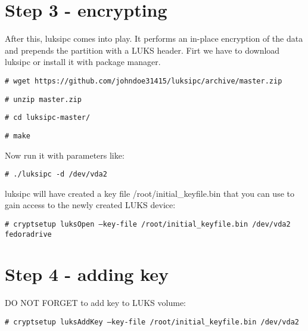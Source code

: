 \documentclass[../xdudla00-porting-Tang-to-Open-WRT.tex]{subfiles}
\begin{document}
\section{Step 3 - encrypting}
After this, luksipc comes into play. It performs an in-place encryption of the data and prepends the partition with a LUKS header. Firt we have to download luksipc or install it with package manager.

{\tt \# wget https://github.com/johndoe31415/luksipc/archive/master.zip}

{\tt \# unzip master.zip}

{\tt \# cd luksipc-master/}

{\tt \# make}

Now run it with parameters like:

{\tt \# ./luksipc -d /dev/vda2}

luksipc will have created a key file /root/initial\_keyfile.bin that you can use to gain access to the newly created LUKS device:

{\tt \# cryptsetup luksOpen --key-file /root/initial\_keyfile.bin /dev/vda2 fedoradrive}

\section{Step 4 - adding key}

DO NOT FORGET to add key to LUKS volume:

{\tt \# cryptsetup luksAddKey --key-file /root/initial\_keyfile.bin /dev/vda2}
\end{document}
